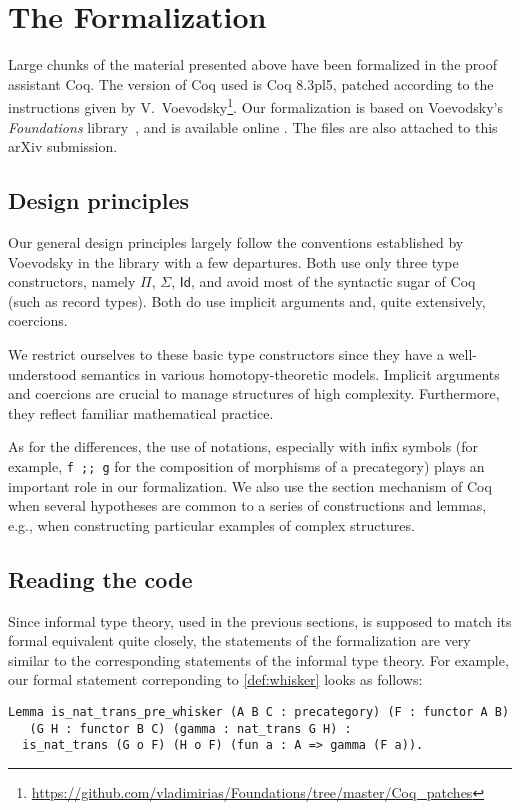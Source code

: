 
\section{The Formalization}
\label{sec:formalization}


Large chunks of the material presented above have been formalized in the proof assistant \textsf{Coq}.
The version of \textsf{Coq} used is \textsf{Coq} 8.3pl5, patched according to the instructions given by
V.\ Voevodsky\footnote{\url{https://github.com/vladimirias/Foundations/tree/master/Coq_patches}}.
Our formalization is based on Voevodsky's \emph{Foundations} library~\cite{vv_foundations},
and is available online \cite{rezk_coq}. 
The files are also attached to this arXiv submission.


\subsection*{Design principles}
Our general design principles largely follow the conventions established by Voevodsky in the library \cite{vv_foundations} 
with a few departures. 
Both use only three type constructors, namely $\Pi$, $\Sigma$, $\textsf{Id}$, and avoid most of the syntactic sugar of \textsf{Coq} (such as record types).
Both do use implicit arguments and, quite extensively, coercions.

We restrict ourselves to these basic type constructors since they have a well-understood
semantics in various homotopy-theoretic models. Implicit arguments and coercions are 
crucial to manage structures of high complexity. Furthermore, they reflect
 familiar mathematical practice.


As for the differences, the use of notations, especially with infix symbols (for example, \lstinline!f ;; g! for 
the composition of morphisms of a precategory) plays an important role in our formalization. 
We also use the section mechanism of \textsf{Coq} 
when several hypotheses are common to a series of constructions and lemmas, e.g., 
when constructing particular examples of complex structures.

\subsection*{Reading the code}

Since informal type theory, used in the previous sections, is supposed to match its formal equivalent quite closely, 
the statements of the formalization are very similar to the corresponding statements of the informal type theory. 
For example, our formal statement correponding to \autoref{def:whisker} looks as follows:
\begin{lstlisting}
Lemma is_nat_trans_pre_whisker (A B C : precategory) (F : functor A B)
   (G H : functor B C) (gamma : nat_trans G H) :
  is_nat_trans (G o F) (H o F) (fun a : A => gamma (F a)).
\end{lstlisting}


